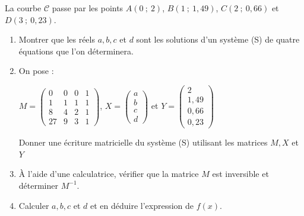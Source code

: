 \begin{center}
\end{center}
\par
La courbe $\mathscr{C}$ passe par les points $A(0~;~2)$, $B(1~;~1,49)$, $C(2~;~0,66)$ et $D(3~;~0,23)$.
\par
\begin{enumerate}
     \item %
     Montrer que les réels $a, b, c$ et $d$ sont les solutions d'un système (S) de quatre équations que l'on déterminera.
     \item %
     On pose :
     \begin{center}
          $M = \begin{pmatrix}
               0 &0 &0 &1 \\
               1 &1 &1 &1 \\
               8 &4 &2 &1 \\
          27 &9 &3 &1  \end{pmatrix}$,
          $     X = \begin{pmatrix}
               a \\
               b \\
               c \\
          d  \end{pmatrix} $
          et
          $   Y = \begin{pmatrix}
               2 \\
               1,49 \\
               0,66 \\
          0,23 \end{pmatrix}$
     \end{center}
     Donner une écriture matricielle du système (S) utilisant les matrices $M, X$ et $Y$
     \item %
     \`A l'aide d'une calculatrice, vérifier que la matrice $M$ est inversible et déterminer $M^{-1}$.
     \item %
     Calculer $a, b, c$ et $d$ et en déduire l'expression de $f(x)$.
     \par
\end{enumerate}
\par
%
%
